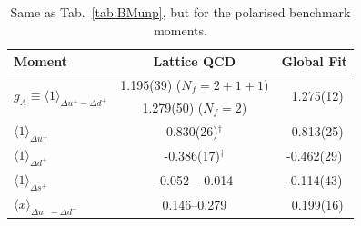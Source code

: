 \begin{table}[!t]
\centering
\renewcommand{\arraystretch}{1.2}
\begin{tabular}{lcc}
\toprule
Moment & Lattice QCD & Global Fit\\
\midrule
\multirow{2}{*}{$g_A\equiv\langle 1\rangle_{\Delta u^+ - \Delta d^+}$} 
& 1.195(39) ($N_f=2+1+1$) 
& \multirow{2}{*}{\ 1.275(12)} \\
& 1.279(50) ($N_f=2$) \\
$\langle 1 \rangle_{\Delta u^+}$     
& 0.830(26)$^\dagger$ 
& \ 0.813(25)\\
$\langle 1 \rangle_{\Delta d^+}$     
& -0.386(17)$^\dagger$ 
& -0.462(29)\\
$\langle 1 \rangle_{\Delta s^+}$     
& -0.052\,--\,-0.014
& -0.114(43)\\
$\langle x\rangle_{\Delta u^- - \Delta d^-}$       
& \numrange{0.146}{0.279} 
& \ 0.199(16)\\
\bottomrule
\end{tabular}
\caption{\small Same as Tab.~\ref{tab:BMunp}, but for the polarised benchmark 
moments.}
\label{tab:BMpol}
\end{table}











%
%
%
